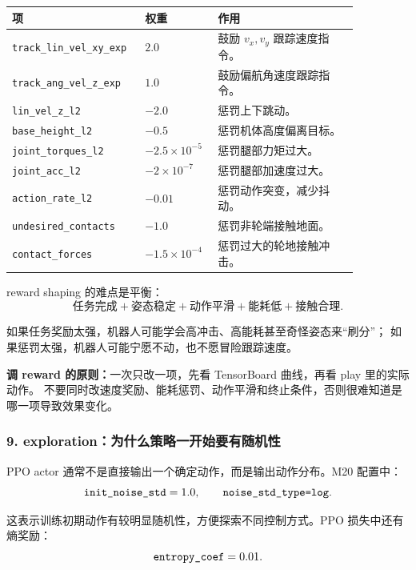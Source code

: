 \documentclass[UTF8,11pt,a4paper]{ctexart}
\begin{document}
\begin{center}
\renewcommand{\arraystretch}{1.25}
\begin{tabular}{p{0.30\linewidth}p{0.18\linewidth}p{0.38\linewidth}}
\toprule
\textbf{项} & \textbf{权重} & \textbf{作用}\\
\midrule
\texttt{track\_lin\_vel\_xy\_exp} & \(2.0\) & 鼓励 \(v_x,v_y\) 跟踪速度指令。\\
\texttt{track\_ang\_vel\_z\_exp} & \(1.0\) & 鼓励偏航角速度跟踪指令。\\
\texttt{lin\_vel\_z\_l2} & \(-2.0\) & 惩罚上下跳动。\\
\texttt{base\_height\_l2} & \(-0.5\) & 惩罚机体高度偏离目标。\\
\texttt{joint\_torques\_l2} & \(-2.5\times10^{-5}\) & 惩罚腿部力矩过大。\\
\texttt{joint\_acc\_l2} & \(-2\times10^{-7}\) & 惩罚腿部加速度过大。\\
\texttt{action\_rate\_l2} & \(-0.01\) & 惩罚动作突变，减少抖动。\\
\texttt{undesired\_contacts} & \(-1.0\) & 惩罚非轮端接触地面。\\
\texttt{contact\_forces} & \(-1.5\times10^{-4}\) & 惩罚过大的轮地接触冲击。\\
\bottomrule
\end{tabular}
\end{center}

reward shaping 的难点是平衡：
\[
\text{任务完成}
+
\text{姿态稳定}
+
\text{动作平滑}
+
\text{能耗低}
+
\text{接触合理}.
\]

如果任务奖励太强，机器人可能学会高冲击、高能耗甚至奇怪姿态来“刷分”；
如果惩罚太强，机器人可能宁愿不动，也不愿冒险跟踪速度。

\begin{answerbox}
\textbf{调 reward 的原则：}一次只改一项，先看 TensorBoard 曲线，再看 play 里的实际动作。
不要同时改速度奖励、能耗惩罚、动作平滑和终止条件，否则很难知道是哪一项导致效果变化。
\end{answerbox}

\subsubsection{9. exploration：为什么策略一开始要有随机性}

PPO actor 通常不是直接输出一个确定动作，而是输出动作分布。M20 配置中：
\[
\text{\texttt{init\_noise\_std}}=1.0,\qquad
\text{\texttt{noise\_std\_type=log}}.
\]

这表示训练初期动作有较明显随机性，方便探索不同控制方式。PPO 损失中还有熵奖励：
\[
\text{\texttt{entropy\_coef}}=0.01.
\]
\end{document}
